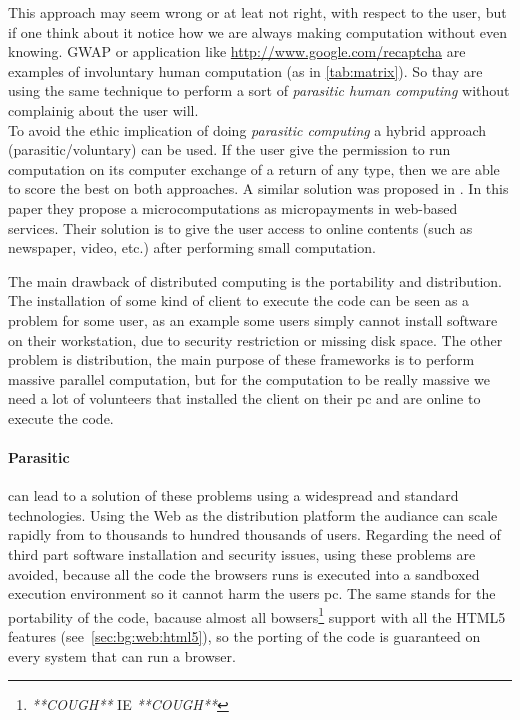 This approach may seem wrong or at leat not right, with respect to the user, but
if one think about it notice how we are always making computation without even
knowing. \ac{GWAP} or application like \href{reCAPTCHA}{http://www.google.com/recaptcha}
are examples of involuntary human computation (as in \autoref{tab:matrix}). So
thay are using the same technique to perform a sort of \emph{parasitic human
computing} without complainig about the user will.\\

To avoid the ethic implication of doing \emph{parasitic computing} a hybrid
approach (parasitic/voluntary) can be used. If the user give the permission to
run computation on its computer exchange of a return of any type, then we are
able to score the best on both approaches. A similar solution was proposed in
\cite{karame2011pay}.
In this paper they propose a microcomputations as micropayments in web-based
services. Their solution is to give the user access to online contents (such as
newspaper, video, etc.) after performing small \js{} computation.


The main drawback of distributed computing is the portability and distribution.
The installation of some kind of client to execute the code can be seen as a problem for some
user, as an example some users simply cannot install software on their workstation, due to security
restriction or missing disk space. The other problem is distribution, the main purpose of these
frameworks is to perform massive parallel computation, but for the computation to be really 
massive we need a lot of volunteers that installed the client on their pc and are online to execute
the code.

\paragraph{Parasitic \js{}} can lead to a solution of these problems using a widespread
and standard technologies. Using the Web as the distribution platform the audiance can scale
rapidly from to thousands to hundred thousands of users. Regarding the need of third part software
installation and security issues, using \js{} these problems are avoided, because all the code the browsers
runs is executed into a sandboxed execution environment so it cannot harm the users pc. The same stands
for the portability of the code, bacause almost all bowsers\footnote{\emph{**COUGH**} IE \emph{**COUGH**}} support
\js{} with all the HTML5 features (see~\ref{sec:bg:web:html5}), so the porting of the code
is guaranteed on every system that can run a browser.
